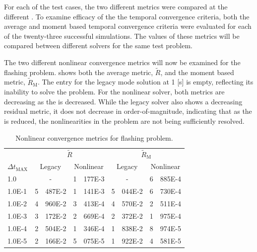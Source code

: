 For each of the test cases, the two different metrics were compared at the different \dtmax{}.
To examine efficacy of the the temporal convergence criteria, both the average and moment based temporal convergence criteria were evaluated for each of the twenty-three successful simulations.
The values of these metrics will be compared between different solvers for the same test problem. 

The two different nonlinear convergence metrics will now be examined for the flashing problem.
 shows both the average metric, $\tilde{R}$, and the moment based metric, $\tilde{R}_{\text{M}}$.
The entry for the legacy mode solution at 1 [s] is empty, reflecting its inability to solve the problem.
For the nonlinear solver, both metrics are decreasing as the \dtmax{} is decreased.
While the legacy solver also shows a decreasing residual metric, it does not decrease in order-of-magnitude, indicating that as the \dtmax{} is reduced, the nonlinearities in the problem are not being sufficiently resolved.

\begin{table}[h!t]
\centering
\begin{tabular}{@{}l r@{.}l r@{.}l r@{.}l r@{.}l @{}}
\toprule
& \multicolumn{4}{c}{$\tilde{R}$} & \multicolumn{4}{c}{$\tilde{R}_{\text{M}}$}  \\
$\Delta t_{\text{MAX}}$ & \multicolumn{2}{c}{Legacy} & \multicolumn{2}{c}{Nonlinear} & \multicolumn{2}{c}{Legacy}& \multicolumn{2}{c}{Nonlinear}  \\
\midrule
1.0    & \multicolumn{2}{c}{-} & 1&177E-3 & \multicolumn{2}{c}{-} & 6&885E-4 \\
1.0E-1 & 5&487E-2 & 1&141E-3 & 5&044E-2 & 6&730E-4 \\
1.0E-2 & 4&960E-2 & 3&413E-4 & 4&570E-2 & 2&511E-4 \\
1.0E-3 & 3&172E-2 & 2&669E-4 & 2&372E-2 & 1&975E-4 \\
1.0E-4 & 2&504E-2 & 1&346E-4 & 1&838E-2 & 8&974E-5 \\
1.0E-5 & 2&166E-2 & 5&075E-5 & 1&922E-2 & 4&581E-5 \\
\bottomrule  
\end{tabular}
\caption{Nonlinear convergence metrics for flashing problem.}
\label{tab:flashing_criteria}
\end{table}


